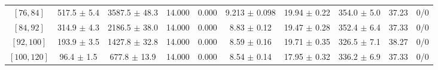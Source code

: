 \begin{tabular}{c||c|c|c|c|c|c|c||c|c}
$[76, 84]$ & 517.5 $\pm$ 5.4 & 3587.5 $\pm$ 48.3 & 14.000 & 0.000 & 9.213 $\pm$ 0.098 & 19.94 $\pm$ 0.22 & 354.0 $\pm$ 5.0 & 37.23 & 0/0\\
$[84, 92]$ & 314.9 $\pm$ 4.3 & 2186.5 $\pm$ 38.0 & 14.000 & 0.000 & 8.83 $\pm$ 0.12 & 19.47 $\pm$ 0.28 & 352.4 $\pm$ 6.4 & 37.33 & 0/0\\
$[92, 100]$ & 193.9 $\pm$ 3.5 & 1427.8 $\pm$ 32.8 & 14.000 & 0.000 & 8.59 $\pm$ 0.16 & 19.71 $\pm$ 0.35 & 326.5 $\pm$ 7.1 & 38.27 & 0/0\\
$[100, 120]$ & 96.4 $\pm$ 1.5 & 677.8 $\pm$ 13.9 & 14.000 & 0.000 & 8.54 $\pm$ 0.14 & 17.95 $\pm$ 0.32 & 336.2 $\pm$ 6.9 & 37.33 & 0/0\\
\end{tabular}
